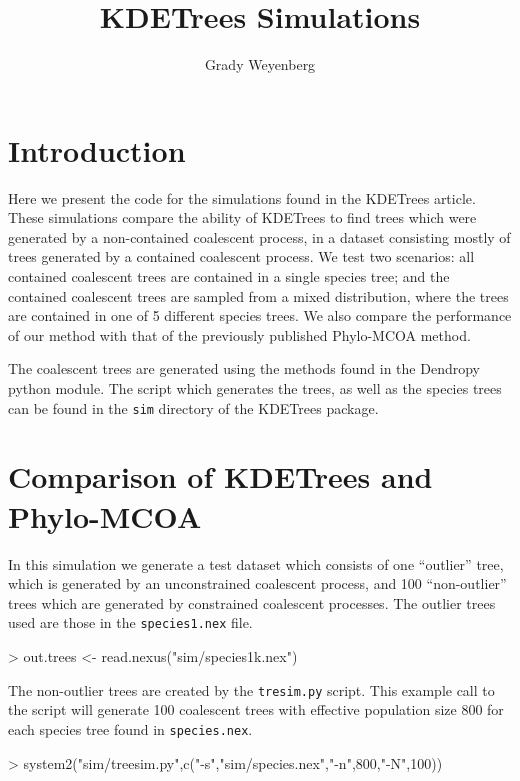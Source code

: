 \documentclass{article}
\title{KDETrees Simulations}
\author{Grady Weyenberg}
\begin{document}
\maketitle

\section{Introduction}
\label{sec:introduction}
Here we present the code for the simulations found in the KDETrees
article. These simulations compare the ability of KDETrees to find
trees which were generated by a non-contained coalescent process, in a
dataset consisting mostly of trees generated by a contained coalescent
process. We test two scenarios: all contained coalescent trees are
contained in a single species tree; and the contained coalescent trees
are sampled from a mixed distribution, where the trees are contained
in one of 5 different species trees. We also compare the performance
of our method with that of the previously published Phylo-MCOA method.

The coalescent trees are generated using the methods found in the
Dendropy python module. The script which generates the trees, as well
as the species trees can be found in the {\tt sim} directory of the
KDETrees package.

\section{Comparison of KDETrees and Phylo-MCOA}
\label{sec:comp-kdetr-phylo}
In this simulation we generate a test dataset which consists of one
``outlier'' tree, which is generated by an unconstrained coalescent
process, and 100 ``non-outlier'' trees which are generated by
constrained coalescent processes. The outlier trees used are those in
the {\tt species1.nex} file.
\begin{Schunk}
\begin{Sinput}
> out.trees <- read.nexus("sim/species1k.nex")
\end{Sinput}
\end{Schunk}
The non-outlier trees are created by the {\tt tresim.py} script.
This example call to the script will generate 100 coalescent trees
with effective population size 800 for each species tree found in
{\tt species.nex}.
\begin{Schunk}
\begin{Sinput}
> system2("sim/treesim.py",c("-s","sim/species.nex","-n",800,"-N",100))
\end{Sinput}
\end{Schunk}
\end{document}
